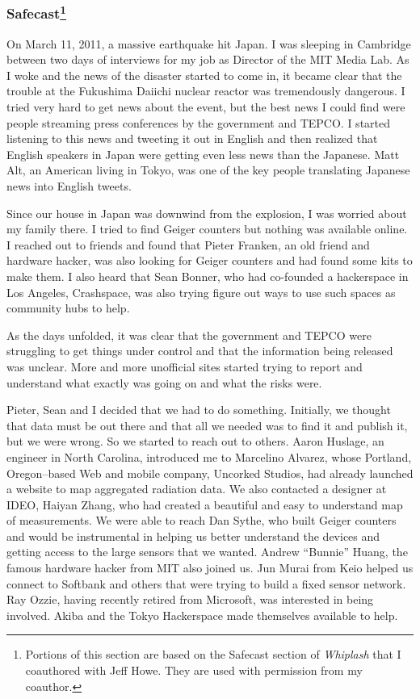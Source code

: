 \subsubsection[Safecast]{Safecast\protect\footnote{Portions of this section are based on the Safecast section of \textit{Whiplash} \cite{ito2016whiplash} that I coauthored with Jeff Howe. They are used with permission from my coauthor.}}

On March 11, 2011, a massive earthquake hit Japan. I was sleeping in Cambridge between two days of interviews for my job as Director of the MIT Media Lab. As I woke and the news of the disaster started to come in, it became clear that the trouble at the Fukushima Daiichi nuclear reactor was tremendously dangerous. I tried very hard to get news about the event, but the best news I could find were people streaming press conferences by the government and \ac{TEPCO}. I started listening to this news and tweeting it out in English and then realized that English speakers in Japan were getting even less news than the Japanese. Matt Alt, an American living in Tokyo, was one of the key people translating Japanese news into English tweets.

Since our house in Japan was downwind from the explosion, I was worried about my family there. I tried to find Geiger counters but nothing was available online. I reached out to friends and found that Pieter Franken, an old friend and hardware hacker, was also looking for Geiger counters and had found some kits to make them. I also heard that Sean Bonner, who had co-founded a hackerspace in Los Angeles, Crashspace, was also trying figure out ways to use such spaces as community hubs to help.

As the days unfolded, it was clear that the government and \ac{TEPCO} were struggling to get things under control and that the information being released was unclear. More and more unofficial sites started trying to report and understand what exactly was going on and what the risks were.

Pieter, Sean and I decided that we had to do something. Initially, we thought that data must be out there and that all we needed was to find it and publish it, but we were wrong. So we started to reach out to others. Aaron Huslage, an engineer in North Carolina, introduced me to Marcelino Alvarez, whose Portland, Oregon–based Web and mobile company, Uncorked Studios, had already launched a website to map aggregated radiation data. We also contacted a designer at IDEO, Haiyan Zhang, who had created a beautiful and easy to understand map of measurements. We were able to reach Dan Sythe, who built Geiger counters and would be instrumental in helping us better understand the devices and getting access to the large sensors that we wanted. Andrew ``Bunnie'' Huang, the famous hardware hacker from MIT also joined us. Jun Murai from Keio helped us connect to Softbank and others that were trying to build a fixed sensor network. Ray Ozzie, having recently retired from Microsoft, was interested in being involved. Akiba and the Tokyo Hackerspace made themselves available to help.

